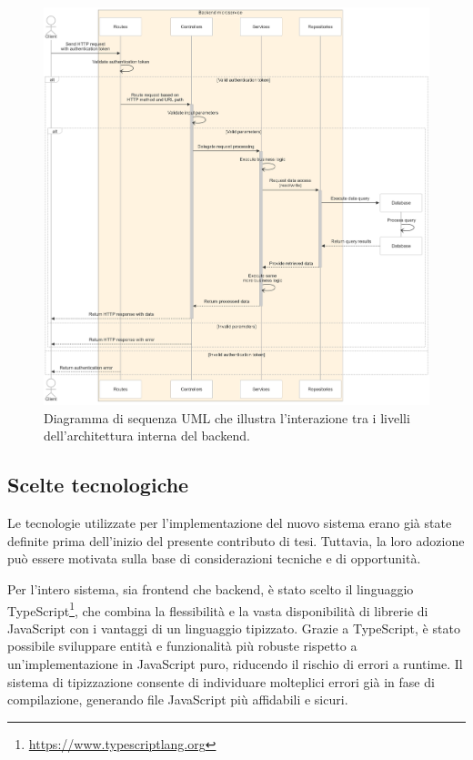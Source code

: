 \begin{figure}
  \centering
  \includegraphics[width=1\textwidth]{figures/microservice-internal-interactions.png}
  \caption{Diagramma di sequenza UML che illustra l'interazione tra i livelli dell'architettura interna del backend.}
  \label{fig:microservice-internal-interactions}
\end{figure}

\subsection{Scelte tecnologiche}
Le tecnologie utilizzate per l'implementazione del nuovo sistema erano già state definite prima dell'inizio del presente contributo di tesi. Tuttavia, la loro adozione può essere motivata sulla base di considerazioni tecniche e di opportunità.

Per l'intero sistema, sia frontend che backend, è stato scelto il linguaggio TypeScript\footnote{\url{https://www.typescriptlang.org}}, che combina la flessibilità e la vasta disponibilità di librerie di JavaScript con i vantaggi di un linguaggio tipizzato. Grazie a TypeScript, è stato possibile sviluppare entità e funzionalità più robuste rispetto a un'implementazione in JavaScript puro, riducendo il rischio di errori a runtime. Il sistema di tipizzazione consente di individuare molteplici errori già in fase di compilazione, generando file JavaScript più affidabili e sicuri.

